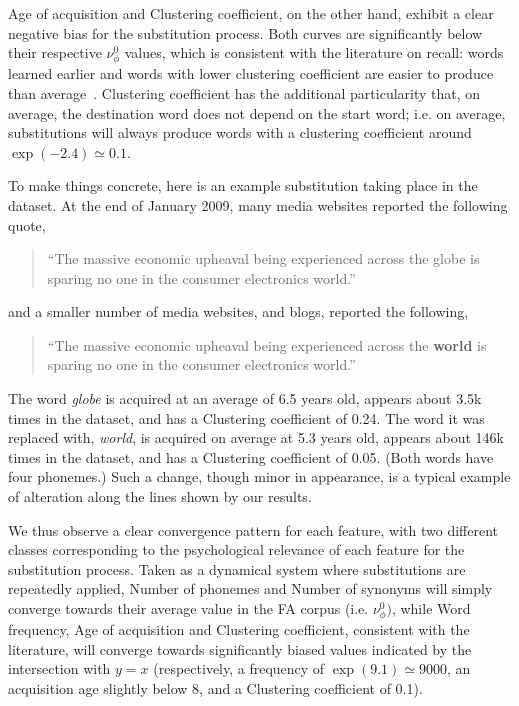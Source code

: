 Age of acquisition and Clustering coefficient, on the other hand, exhibit a clear negative bias for the substitution process. Both curves are significantly below their respective $\nu_{\phi}^0$ values, which is consistent with the literature on recall: words learned earlier and words with lower clustering coefficient are easier to produce than average~\citep{nelson2013activation,Zevin02}.
Clustering coefficient has the additional particularity that, on average, the destination word does not depend on the start word; i.e. on average, substitutions will always produce words with a clustering coefficient around $\exp(-2.4) \simeq 0.1$.

To make things concrete, here is an example substitution taking place in the dataset.
At the end of January 2009, many media websites reported the following quote,

\begin{quote}
    ``The massive economic upheaval being experienced across the globe is sparing no one in the consumer electronics world.''
\end{quote}
and a smaller number of media websites, and blogs, reported the following,
\begin{quote}
    ``The massive economic upheaval being experienced across the \textbf{world} is sparing no one in the consumer electronics world.''
\end{quote}
The word \emph{globe} is acquired at an average of 6.5 years old, appears about 3.5k times in the dataset, and has a Clustering coefficient of 0.24.
The word it was replaced with, \emph{world}, is acquired on average at 5.3 years old, appears about 146k times in the dataset, and has a Clustering coefficient of 0.05. (Both words have four phonemes.)
Such a change, though minor in appearance, is a typical example of alteration along the lines shown by our results.


\medskip
We thus observe a clear convergence pattern for each feature, with two different classes corresponding to the psychological relevance of each feature for the substitution process.
Taken as a dynamical system where substitutions are repeatedly applied, Number of phonemes and Number of synonyms will simply converge towards their average value in the FA corpus (i.e. $\nu_{\phi}^0)$, while Word frequency, Age of acquisition and Clustering coefficient, consistent with the literature, will converge towards significantly biased values indicated by the intersection with $y = x$ (respectively, a frequency of $\exp(9.1) \simeq 9000$, an acquisition age slightly below 8, and a Clustering coefficient of 0.1).

